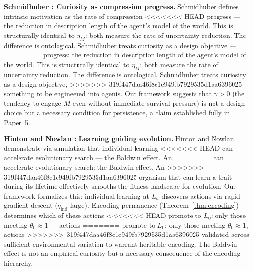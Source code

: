 \documentclass[11pt]{article}
\theoremstyle{definition}
\begin{document}
\textbf{Schmidhuber \cite{Schmidhuber2010}: Curiosity as compression
progress.}
Schmidhuber defines intrinsic motivation as the rate of compression
<<<<<<< HEAD
progress --- the reduction in description length of the agent's model
of the world. This is structurally identical to $\eta_M$: both
measure the rate of uncertainty reduction. The difference is
ontological. Schmidhuber treats curiosity as a design objective ---
=======
progress: the reduction in description length of the agent's model
of the world. This is structurally identical to $\eta_M$: both
measure the rate of uncertainty reduction. The difference is
ontological. Schmidhuber treats curiosity as a design objective,
>>>>>>> 319f447daa46f8c1e949fb7929535d1aa6396025
something to be engineered into agents. Our framework suggests that
$\gamma > 0$ (the tendency to engage $M$ even without immediate survival
pressure) is not a design choice but a necessary condition for
persistence, a claim established fully in Paper~5.

\textbf{Hinton and Nowlan \cite{Hinton1987}: Learning guiding
evolution.}
Hinton and Nowlan demonstrate via simulation that individual learning
<<<<<<< HEAD
can accelerate evolutionary search --- the Baldwin effect. An
=======
can accelerate evolutionary search: the Baldwin effect. An
>>>>>>> 319f447daa46f8c1e949fb7929535d1aa6396025
organism that can learn a trait during its lifetime effectively
smooths the fitness landscape for evolution. Our framework formalizes
this: individual learning at $L_n$ discovers actions via rapid
gradient descent ($\eta_{\mathrm{ind}}$ large). Encoding permanence
(Theorem~\ref{thm:encoding}) determines which of these actions
<<<<<<< HEAD
promote to $L_0$: only those meeting $\theta_0 \approx 1$ --- actions
=======
promote to $L_0$: only those meeting $\theta_0 \approx 1$, actions
>>>>>>> 319f447daa46f8c1e949fb7929535d1aa6396025
validated across sufficient environmental variation to warrant
heritable encoding. The Baldwin effect is not an empirical curiosity
but a necessary consequence of the encoding hierarchy.
\end{document}
